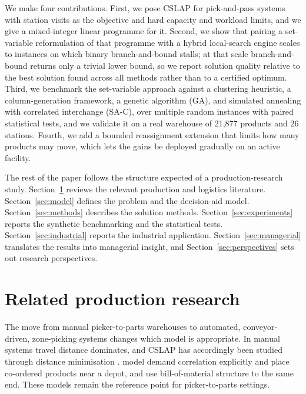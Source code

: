 \documentclass[]{interact}
\begin{document}
We make four contributions. First, we pose CSLAP for pick-and-pass systems with station visits as the objective and hard capacity and workload limits, and we give a mixed-integer linear programme for it. Second, we show that pairing a set-variable reformulation of that programme with a hybrid local-search engine scales to instances on which binary branch-and-bound stalls; at that scale branch-and-bound returns only a trivial lower bound, so we report solution quality relative to the best solution found across all methods rather than to a certified optimum. Third, we benchmark the set-variable approach against a clustering heuristic, a column-generation framework, a genetic algorithm (GA), and simulated annealing with correlated interchange (SA-C), over multiple random instances with paired statistical tests, and we validate it on a real warehouse of 21,877 products and 26 stations. Fourth, we add a bounded reassignment extension that limits how many products may move, which lets the gains be deployed gradually on an active facility.

The rest of the paper follows the structure expected of a production-research study. Section~\ref{sec:litreview} reviews the relevant production and logistics literature. Section~\ref{sec:model} defines the problem and the decision-aid model. Section~\ref{sec:methods} describes the solution methods. Section~\ref{sec:experiments} reports the synthetic benchmarking and the statistical tests. Section~\ref{sec:industrial} reports the industrial application. Section~\ref{sec:managerial} translates the results into managerial insight, and Section~\ref{sec:perspectives} sets out research perspectives.

\section{Related production research}\label{sec:litreview}
The move from manual picker-to-parts warehouses to automated, conveyor-driven, zone-picking systems changes which model is appropriate. In manual systems travel distance dominates, and CSLAP has accordingly been studied through distance minimisation \citep{islam2023, wang2020}. \citet{zhang2019cie} model demand correlation explicitly and place co-ordered products near a depot, and \citet{xiao2010correlated} use bill-of-material structure to the same end. These models remain the reference point for picker-to-parts settings.
\end{document}
